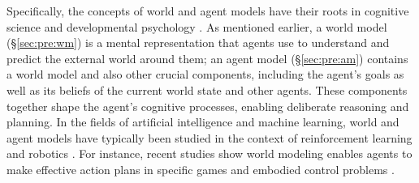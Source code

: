 \documentclass{article}
\def\modelname{\textsc{Law}\xspace}
\newcommand{\hzt}[1]{{\color{red}{[ZT: #1]}}}
\begin{document}

Specifically, the concepts of world and agent models have their roots in cognitive science and developmental psychology \citep[e.g.,][]{tolman1948cognitive,premack1978does,johnson1983mental,johnson2010mental, gentner2014mental,nortmann2015primary,maus2013motion,forrester1971counterintuitive,gopnik1994theory, gergely2003teleological,spelke2007core,battaglia2013simulation,baker2009action,jara2016naive,baker2017rational}. As mentioned earlier, a world model (\S\ref{sec:pre:wm}) is a mental representation that agents use to understand and predict the external world around them; an agent model (\S\ref{sec:pre:am}) contains a world model and also other crucial components, including the agent's goals as well as its beliefs of the current world state and other agents. These components together shape the agent's cognitive processes, enabling deliberate reasoning and planning.
In the fields of artificial intelligence and machine learning, world and agent models have typically been studied in the context of reinforcement learning and robotics \citep[e.g.,][]{toussaint2003learning, schulkin2012action, ha2018world, berkenkamp2017safe, clavera2018model, zhang2019solar, kaiser2019model,moerland2023model, lecun2022path}. For instance, recent studies show world modeling enables agents to make effective action plans in specific games and embodied control problems \citep{schrittwieser2020mastering,hafner2020mastering}. 

\end{document}
